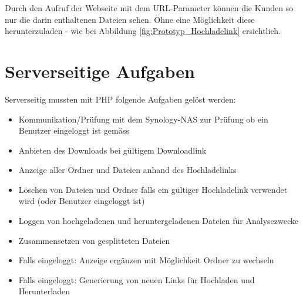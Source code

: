 Durch den Aufruf der Webseite mit dem URL-Parameter können die Kunden so nur die darin enthaltenen Dateien sehen. 
Ohne eine Möglichkeit diese herunterzuladen - wie bei Abbildung \ref{fig:Prototyp_Hochladelink} ersichtlich.

\section{Serverseitige Aufgaben}
Serverseitig mussten mit PHP folgende Aufgaben gelöst werden:
\begin{itemize}
    \item Kommunikation/Prüfung mit dem Synology-NAS zur Prüfung ob ein Benutzer eingeloggt ist gemäss \cite{Synology}
    \item Anbieten des Downloads bei gültigem Downloadlink
    \item Anzeige aller Ordner und Dateien anhand des Hochladelinks    
    \item Löschen von Dateien und Ordner falls ein gültiger Hochladelink verwendet wird (oder Benutzer eingeloggt ist)
    \item Loggen von hochgeladenen und heruntergeladenen Dateien für Analysezwecke
    \item Zusammensetzen von gesplitteten Dateien
    \item Falls eingeloggt: Anzeige ergänzen mit Möglichkeit Ordner zu wechseln
    \item Falls eingeloggt: Generierung von neuen Links für Hochladen und Herunterladen
\end{itemize}